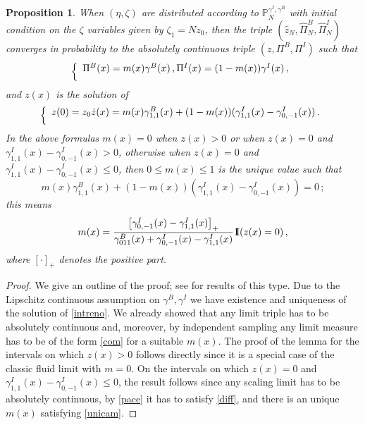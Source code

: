 \documentclass[reqno]{amsart}
\theoremstyle{plain}
\newtheorem{proposition}[theorem]{Proposition}
\theoremstyle{definition}
\theoremstyle{remark}
\numberwithin{equation}{section}
\numberwithin{theorem}{section}
\def\\{\par\medskip}
\newcommand{\id}{{1 \mskip -5mu {\rm I}}}
\renewcommand{\hat}{\widehat}
\newcommand{\<}{\langle}
\renewcommand{\>}{\rangle}
\begin{document}
	\begin{proposition}\label{derby}
		When $(\eta,\zeta)$ are distributed according to $\mathbb P^{\gamma^I,\gamma^B}_N$ with initial condition on the $\zeta$ variables given by $\zeta_1=Nz_0$, then the triple $\left(\hat z_N,\hat{\Pi}_N^B,\hat{\Pi}_N^I\right)$ converges in probability to the absolutely continuous triple $(z,\Pi^B,\Pi^I)$ 
		such that 
		\begin{equation}\label{com}
			\left\{
			\begin{array}{l}
				\Pi^B(x)=m(x)\gamma^B(x)\,, \\
				\Pi^I(x)=(1-m(x))\gamma^I(x)\,,
			\end{array}
			\right.
		\end{equation}
		and $z(x)$ is the solution of
		\begin{equation}\label{intreno}
			\left\{
			\begin{array}{l}
				z(0)=z_0\\
				\dot z(x)=m(x)\gamma^B_{1,1}(x)+(1-m(x))(\gamma_{1,1}^I(x)-\gamma^I_{0,-1}(x))\,.
			\end{array}
			\right.
		\end{equation}
		In the above formulas $m(x)=0$ when $z(x)>0$ or when $z(x)=0$ and $\gamma^I_{1,1}(x)-\gamma^I_{0,-1}(x)>0$, otherwise when $z(x)=0$ and $\gamma^I_{1,1}(x)-\gamma^I_{0,-1}(x)\leq 0$, then $0\leq m(x) \leq 1$ is the unique value such that
		\begin{equation}\label{unicam}
			m(x)\gamma^B_{1,1}(x)+(1-m(x))(\gamma_{1,1}^I(x)-\gamma^I_{0,-1}(x))=0\,;
		\end{equation}
		this means 
		\begin{equation}
			m(x)=\frac{\left[\gamma^I_{0,-1}(x)-\gamma^I_{1,1}(x)\right]_+}{\gamma^B_{011}(x)+\gamma^I_{0,-1}(x)-\gamma^I_{1,1}(x)}\id(z(x)=0)\,,
		\end{equation}
		where $[\cdot ]_+$ denotes the positive part.
	\end{proposition}
	\begin{proof}
		We give an outline of the proof; see \cite{EK, SW} for results of this type.
		Due to the Lipschitz continuous assumption on $\gamma^B, \gamma^I$ we have existence and uniqueness of the solution of \eqref{intreno}. We already showed that any limit triple has to be absolutely continuous and, moreover, by independent sampling any limit measure has to be of the form \eqref{com} for a suitable $m(x)$. The proof of the lemma for the intervals on which $z(x)>0$ follows directly since it is a special case of the classic fluid limit \cite{K, SW} with $m=0$. On the intervals on which $z(x)=0$ and $\gamma^I_{1,1}(x)-\gamma^I_{0,-1}(x)\leq 0$, the result follows since any scaling limit has to be absolutely continuous, by \eqref{pace} it has to satisfy \eqref{diff}, and there is an unique $m(x)$ satisfying \eqref{unicam}.
	\end{proof}
	
\end{document}
